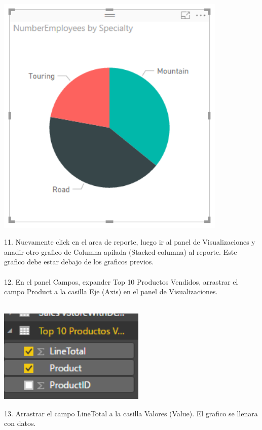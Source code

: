 \documentclass[12pt,letterpaper]{article}
\begin{document}
\begin{center}
\includegraphics[width=11cm]{IMG/27.png} 
\end{center}
11. Nuevamente click en el area de reporte, luego ir al panel de Visualizaciones y anadir otro grafico de
Columna apilada (Stacked columna) al reporte. Este grafico debe estar debajo de los graficos previos.\\\\
12. En el panel Campos, expander Top 10 Productos Vendidos, arrastrar el campo Product a la casilla Eje (Axis)
en el panel de Visualizaciones.\\\\
\begin{center}
\includegraphics[width=7cm]{IMG/28.png} 
\end{center}
13. Arrastrar el campo LineTotal a la casilla Valores (Value). El grafico se llenara con datos.\\\\
\end{document}
